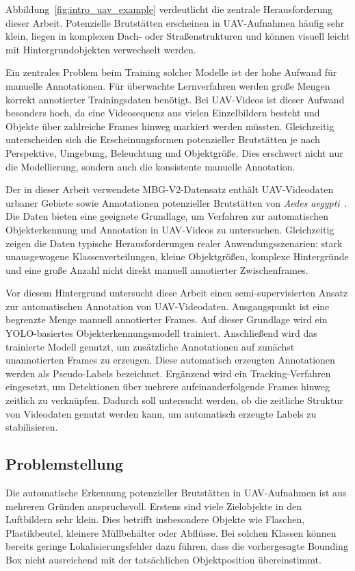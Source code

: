 Abbildung~\ref{fig:intro_uav_example} verdeutlicht die zentrale Herausforderung dieser Arbeit. Potenzielle Brutstätten erscheinen in UAV-Aufnahmen häufig sehr klein, liegen in komplexen Dach- oder Straßenstrukturen und können visuell leicht mit Hintergrundobjekten verwechselt werden.

Ein zentrales Problem beim Training solcher Modelle ist der hohe Aufwand für manuelle Annotationen. Für überwachte Lernverfahren werden große Mengen korrekt annotierter Trainingsdaten benötigt. Bei UAV-Videos ist dieser Aufwand besonders hoch, da eine Videosequenz aus vielen Einzelbildern besteht und Objekte über zahlreiche Frames hinweg markiert werden müssten. Gleichzeitig unterscheiden sich die Erscheinungsformen potenzieller Brutstätten je nach Perspektive, Umgebung, Beleuchtung und Objektgröße. Dies erschwert nicht nur die Modellierung, sondern auch die konsistente manuelle Annotation.

Der in dieser Arbeit verwendete MBG-V2-Datensatz enthält UAV-Videodaten urbaner Gebiete sowie Annotationen potenzieller Brutstätten von \textit{Aedes aegypti}~\cite{passos2024mbgv2}. Die Daten bieten eine geeignete Grundlage, um Verfahren zur automatischen Objekterkennung und Annotation in UAV-Videos zu untersuchen. Gleichzeitig zeigen die Daten typische Herausforderungen realer Anwendungsszenarien: stark unausgewogene Klassenverteilungen, kleine Objektgrößen, komplexe Hintergründe und eine große Anzahl nicht direkt manuell annotierter Zwischenframes.

Vor diesem Hintergrund untersucht diese Arbeit einen semi-supervisierten Ansatz zur automatischen Annotation von UAV-Videodaten. Ausgangspunkt ist eine begrenzte Menge manuell annotierter Frames. Auf dieser Grundlage wird ein YOLO-basiertes Objekterkennungsmodell trainiert. Anschließend wird das trainierte Modell genutzt, um zusätzliche Annotationen auf zunächst unannotierten Frames zu erzeugen. Diese automatisch erzeugten Annotationen werden als Pseudo-Labels bezeichnet. Ergänzend wird ein Tracking-Verfahren eingesetzt, um Detektionen über mehrere aufeinanderfolgende Frames hinweg zeitlich zu verknüpfen. Dadurch soll untersucht werden, ob die zeitliche Struktur von Videodaten genutzt werden kann, um automatisch erzeugte Labels zu stabilisieren.

\subsection{Problemstellung}

Die automatische Erkennung potenzieller Brutstätten in UAV-Aufnahmen ist aus mehreren Gründen anspruchsvoll. Erstens sind viele Zielobjekte in den Luftbildern sehr klein. Dies betrifft insbesondere Objekte wie Flaschen, Plastikbeutel, kleinere Müllbehälter oder Abflüsse. Bei solchen Klassen können bereits geringe Lokalisierungsfehler dazu führen, dass die vorhergesagte Bounding Box nicht ausreichend mit der tatsächlichen Objektposition übereinstimmt.

